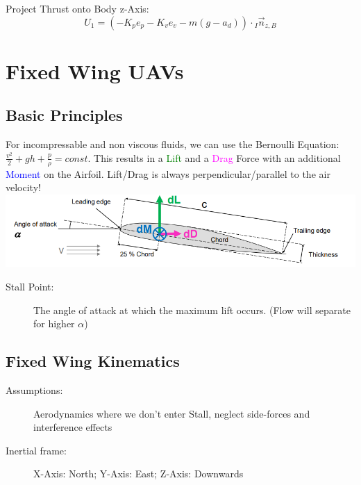 \documentclass[fontsize=6pt,DIV=calc,a4paper,ngerman]{scrartcl}
\begin{document}
\begin{multicols*}{4}
	Project Thrust onto Body z-Axis:
	$$U_1 = (-K_pe_p-K_ve_v-m(g-a_d) )\cdot{}_I\vec{n}_{z,B}$$

	\section{Fixed Wing UAVs}
	\subsection{Basic Principles}
	For incompressable and non viscous fluids, we can use the Bernoulli Equation:
	$\frac{v^2}{2}+gh+\frac{p}{\rho} = const.$
	This results in a \textcolor{green}{Lift} and a \textcolor{magenta}{Drag} Force with an additional \textcolor{blue}{Moment} on the Airfoil. Lift/Drag is always perpendicular/parallel to the air velocity!\\
	\includegraphics[width=\linewidth]{Aerodynamics.png}
	\begin{description}
		\item[Stall Point:] The angle of attack at which the maximum lift occurs. (Flow will separate for higher $\alpha$)
	\end{description}

	\subsection{Fixed Wing Kinematics}
	\begin{description}
		\item[Assumptions:] Aerodynamics where we don't enter Stall, neglect side-forces and interference effects
		\item[Inertial frame:] X-Axis: North;
		      Y-Axis: East;
		      Z-Axis: Downwards


\end{description}
\end{multicols*}
\end{document}
